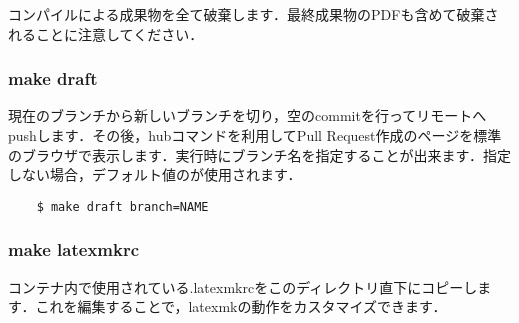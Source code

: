 \documentclass[main]{subfiles}
\begin{document}
コンパイルによる成果物を全て破棄します．最終成果物のPDFも含めて破棄されることに注意してください．

\subsubsection{make draft}

現在のブランチから新しいブランチを切り，空のcommitを行ってリモートへpushします．その後，hubコマンドを利用してPull Request作成のページを標準のブラウザで表示します．実行時にブランチ名を指定することが出来ます．指定しない場合，デフォルト値のが使用されます．

\begin{lstlisting}
    $ make draft branch=NAME
\end{lstlisting}

\subsubsection{make latexmkrc}
\label{sec:mklatexmkrc}

コンテナ内で使用されている.latexmkrcをこのディレクトリ直下にコピーします．これを編集することで，latexmkの動作をカスタマイズできます．
\end{document}
